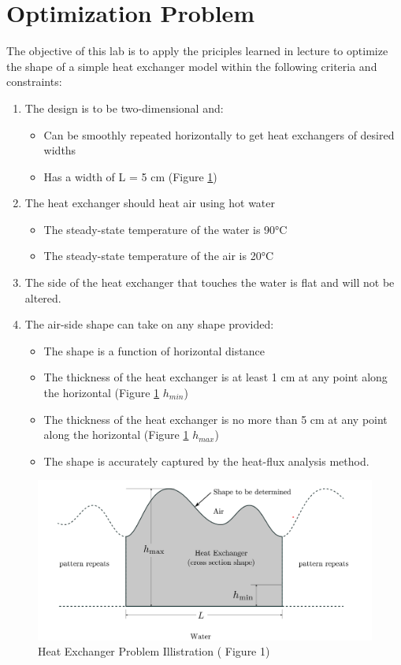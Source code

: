 \documentclass[11pt]{article}%
\begin{document}
\section{Optimization Problem}
\label{sec:problem}
The objective of this lab is to apply the priciples learned in lecture to optimize the shape of a simple heat exchanger model within the following criteria and constraints\cite{lab1doc}:
\begin{enumerate}
	\item The design is to be two-dimensional and:
	\begin{itemize}
		\item  Can be smoothly repeated horizontally to get heat exchangers of desired widths
		\item Has a width of L = 5 cm (Figure \ref{fig:hxintro1})
	\end{itemize}
	\item The heat exchanger should heat air using hot water
	\begin{itemize}
		\item The steady-state temperature of the water is 90\si{\degreeCelsius}
		\item The steady-state temperature of the air is 20\si{\degreeCelsius}
	\end{itemize}
	\item The side of the heat exchanger that touches the water is flat and will not be altered.
	\item The air-side shape can take on any shape provided:
	\begin{itemize}
		\item The shape is a function of horizontal distance 
		\item The thickness of the heat exchanger is at least 1 cm at any point along the horizontal (Figure \ref{fig:hxintro1} $h_{min}$)
		\item The thickness of the heat exchanger is no more than 5 cm at any point along the horizontal (Figure \ref{fig:hxintro1} $h_{max}$)
		\item The shape is accurately captured by the heat-flux analysis method.
	\end{itemize}
\end{enumerate}
\begin{figure}[h!]
    \centering
    \includegraphics[width=0.75\linewidth]{introfig1.png}
    \caption{ Heat Exchanger Problem Illistration (\cite{lab1doc} Figure 1)}
    \label{fig:hxintro1}
\end{figure}
\end{document}
